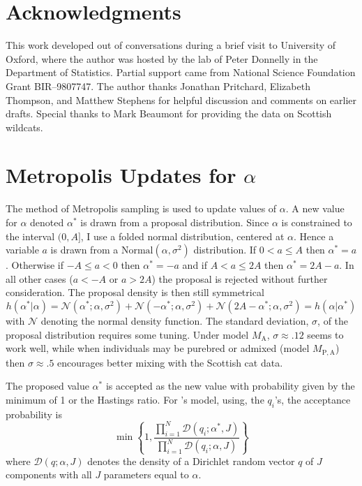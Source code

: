\documentclass[11pt]{article}
\newcommand{\Mpa}{M_\mathrm{P,A}}
\newcommand{\Ma}{M_\mathrm{A}}
\begin{document}
\section*{Acknowledgments}
This work developed out of conversations during a brief visit
to University of Oxford, where the author was hosted by the lab of Peter Donnelly in the 
Department of Statistics. Partial support came from
National Science Foundation Grant BIR--9807747.  The author thanks Jonathan Pritchard, Elizabeth Thompson, and
Matthew Stephens for helpful discussion and comments on earlier drafts. Special thanks to Mark Beaumont for providing
the data on Scottish wildcats.


\appendix

\makeatletter   %
 \renewcommand{\@seccntformat}[1]{APPENDIX~{\csname the#1\endcsname}.\hspace*{1em}}
 \makeatother



\section{Metropolis Updates for $\alpha$}
\label{sec:MH}
The method of Metropolis sampling is used to update values of $\alpha$.  A new
value for $\alpha$ denoted $\alpha^*$ is drawn from a proposal distribution.  Since $\alpha$
is constrained to the interval $(0,A]$, I use a folded normal distribution, centered at
$\alpha$.  Hence a variable $a$ is drawn from a $\mathrm{Normal}(\alpha,\sigma^2)$
distribution.  If $0<a\leq A$ then $\alpha^* = a$.  Otherwise if $-A\leq a<0$ then $\alpha^*
= -a$ and if $A<a\leq 2A$ then $\alpha^* = 2A -a$.  In all other cases ($a<-A$ or $a>2A$) the proposal is
rejected without further consideration.  The proposal density is then still symmetrical
\[
h(\alpha^*|\alpha) = \mathcal{N}(\alpha^*;\alpha,\sigma^2) 
+ \mathcal{N}(-\alpha^*;\alpha,\sigma^2) + \mathcal{N}(2A-\alpha^*;\alpha,\sigma^2)  
= h(\alpha|\alpha^*)
\]
with $\mathcal{N}$ denoting the normal density function.  The standard deviation, $\sigma$, of the
proposal distribution
 requires some tuning.  Under model $\Ma$,  $\sigma \approx .12$ seems to
work well, while when individuals may be purebred or admixed (model $\Mpa$) then $\sigma
\approx .5$ encourages better mixing with the Scottish cat data.

The proposed value $\alpha^*$ is accepted as the new value with probability given by the
minimum of 1 or the  Hastings ratio.   For 's model, using, the
$q_i$'s, the acceptance probability is 
\begin{equation}
\min\left\{1, 
\frac{\prod_{i=1}^N \mathcal{D}(q_i;\alpha^*,J)}
{\prod_{i=1}^N \mathcal{D}(q_i;\alpha,J)} \right\}
\end{equation}
where $\mathcal{D}(q;\alpha,J)$ denotes the density of a Dirichlet random vector $q$ of $J$
components with all $J$ parameters equal to $\alpha$.
\end{document}

